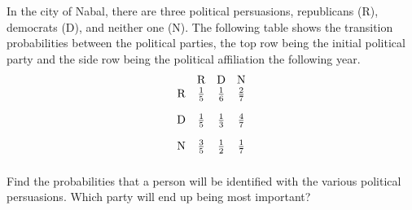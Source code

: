 \begin{enumialphparenastyle}
\begin{ex} In the city of Nabal, there are three political persuasions,
republicans (R), democrats (D), and neither one (N). The following table
shows the transition probabilities between the political parties, the top
row being the initial political party and the side row being the political
affiliation the following year.%
\begin{equation*}
\begin{array}{cccc}
& \text{R} & \text{D} & \text{N} \\
\text{R} & \vspace{0.05in}\frac{1}{5} & \vspace{0.05in}\frac{1}{6} & \vspace{0.05in}\frac{2}{7} \\
\text{D} & \vspace{0.05in}\frac{1}{5} & \vspace{0.05in}\frac{1}{3} & \vspace{0.05in}\frac{4}{7} \\
\text{N} & \vspace{0.05in}\frac{3}{5} & \vspace{0.05in}\frac{1}{2} & \vspace{0.05in}\frac{1}{7}
\end{array}
\end{equation*}
Find the probabilities that a person will be identified with the various
political persuasions. Which party will end up being most important?
\end{ex}


\end{enumialphparenastyle}
